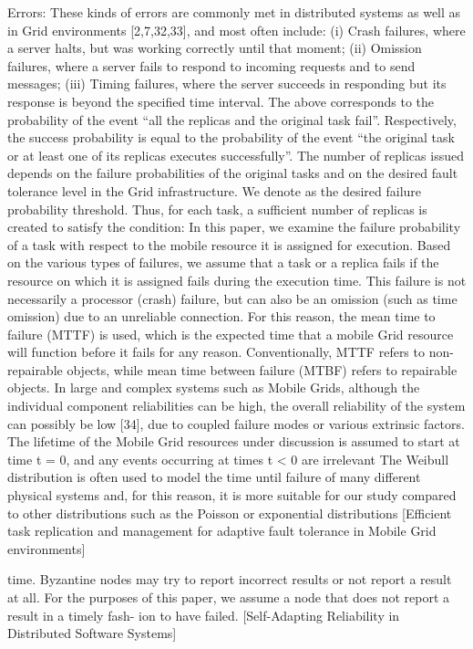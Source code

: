 \documentclass{cslthse-msc}
\begin{document}
Errors: These kinds of errors are commonly met in distributed systems as well as in Grid environments [2,7,32,33], and most often include: (i) Crash failures, where a server halts, but was working correctly until that moment; (ii) Omission failures, where a server fails to respond to incoming requests and to send messages; (iii) Timing failures, where the server succeeds in responding but its response is beyond the specified time interval.
The above corresponds to the probability of the event “all the replicas and the original task fail”. Respectively, the success probability is equal to the probability of the event “the original task or at least one of its replicas executes successfully”. The number of replicas issued depends on the failure probabilities of the original tasks and on the desired fault tolerance level in the Grid infrastructure. We denote   as the desired failure probability threshold. Thus, for each task, a sufficient number of replicas is created to satisfy the condition:
In this paper, we examine the failure probability of a task
with respect to the mobile resource it is assigned for execution. Based on the various types of failures, we assume that a task or a replica fails if the resource on which it is assigned fails during the execution time. This failure is not necessarily a processor (crash) failure, but can also be an omission (such as time omission) due to an unreliable connection. For this reason, the mean time to failure (MTTF) is used, which is the expected time
that a mobile Grid resource will function before it fails for any reason. Conventionally, MTTF refers to non-repairable objects, while mean time between failure (MTBF) refers to repairable objects. In large and complex systems such as Mobile Grids, although the individual component reliabilities can be high, the overall reliability of the system can possibly be low [34], due to coupled failure modes or various extrinsic factors. The lifetime of the Mobile Grid resources under discussion is assumed to start at time t = 0, and any events occurring at times t < 0 are irrelevant
The Weibull distribution is often used to model the time until failure of many different physical systems and, for this reason, it is more suitable for our study compared to other distributions such as the Poisson or exponential distributions
 [Efficient task replication and management for adaptive fault tolerance in Mobile Grid environments]
 
 time. Byzantine nodes may try to report incorrect results or not report a result at all. For the purposes of this paper, we assume a node that does not report a result in a timely fash- ion to have failed. [Self-Adapting Reliability in Distributed Software Systems]
 
\end{document}

